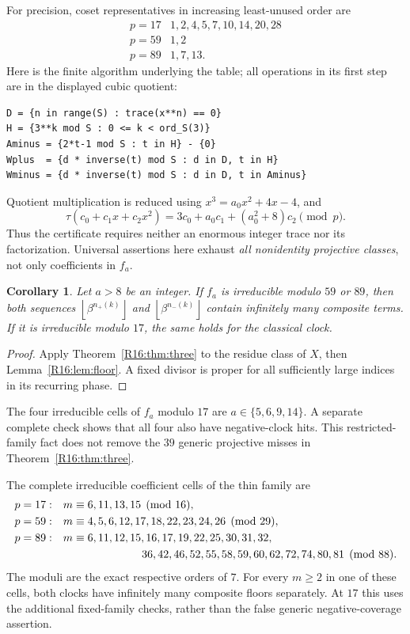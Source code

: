 \documentclass[11pt,a4paper]{article}
\newtheorem{corollary}[theorem]{Corollary}\newtheorem{mainthm}[theorem]{Theorem}
\theoremstyle{definition}\newtheorem{definition}[theorem]{Definition}
\theoremstyle{remark}\newtheorem{remark}[theorem]{Remark}
\newcommand{\floor}[1]{\left\lfloor#1\right\rfloor}
\begin{document}
For precision, coset representatives in increasing least-unused order are
\[
\begin{array}{c|l}
p=17&1,2,4,5,7,10,14,20,28\\
p=59&1,2\\
p=89&1,7,13.
\end{array}
\]
Here is the finite algorithm underlying the table; all operations in its
first step are in the displayed cubic quotient:
\begin{lstlisting}
D = {n in range(S) : trace(x**n) == 0}
H = {3**k mod S : 0 <= k < ord_S(3)}
Aminus = {2*t-1 mod S : t in H} - {0}
Wplus  = {d * inverse(t) mod S : d in D, t in H}
Wminus = {d * inverse(t) mod S : d in D, t in Aminus}
\end{lstlisting}
Quotient multiplication is reduced using $x^3=a_0x^2+4x-4$, and
\begin{equation}\label{R16:eq:tracefunctional}
 \tau(c_0+c_1x+c_2x^2)=3c_0+a_0c_1+(a_0^2+8)c_2\pmod p.
\end{equation}
Thus the certificate requires neither an enormous integer trace nor its
factorization. Universal assertions here exhaust \emph{all nonidentity projective
classes}, not only coefficients in $f_a$.

\begin{corollary}\label{R16:cor:floors}
Let $a>8$ be an integer. If $f_a$ is irreducible modulo $59$ or $89$,
then both sequences $\floor{\beta^{n_+(k)}}$ and
$\floor{\beta^{n_-(k)}}$ contain infinitely many composite terms.
If it is irreducible modulo $17$, the same holds for the classical clock.
\end{corollary}
\begin{proof}
Apply Theorem~\ref{R16:thm:three} to the residue class of $X$, then
Lemma~\ref{R16:lem:floor}. A fixed divisor is proper for all sufficiently
large indices in its recurring phase.
\end{proof}

The four irreducible cells of $f_a$ modulo $17$ are
$a\in\{5,6,9,14\}$. A separate complete check shows that all four also
have negative-clock hits. This restricted-family fact does not remove the
$39$ generic projective misses in Theorem~\ref{R16:thm:three}.

The complete irreducible coefficient cells of the thin family are
\begin{align*}
 p=17:\quad&m\equiv6,11,13,15\pmod{16},\\
 p=59:\quad&m\equiv4,5,6,12,17,18,22,23,24,26\pmod{29},\\
 p=89:\quad&m\equiv6,11,12,15,16,17,19,22,25,30,31,32,\\
 &\hspace{25mm}36,42,46,52,55,58,59,60,62,72,74,80,81\pmod{88}.
\end{align*}
The moduli are the exact respective orders of $7$. For every $m\ge2$
in one of these cells, both clocks have infinitely many composite floors
separately. At $17$ this uses the additional fixed-family checks, rather
than the false generic negative-coverage assertion.
\end{document}
